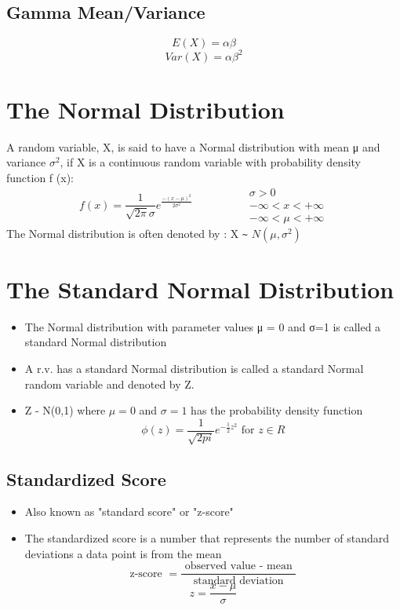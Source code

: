\documentclass{article}
\begin{document}
\subsection{Gamma Mean/Variance}
$$ E(X) = \alpha \beta$$
$$ Var(X) = \alpha \beta^2$$

\section{The Normal Distribution}
A random variable, X, is said to have a Normal distribution with
mean μ and variance \(\sigma^2\), if X is a continuous random variable with probability density function f (x):
$$ f(x) = \frac{1}{\sqrt{2\pi} \sigma} e^{\frac{-(x-\mu)^2}{2\sigma^2}} \hspace{2cm} \begin{matrix}
\sigma > 0 \\ - \infty < x < +\infty \\ -\infty < \mu < +\infty
\end{matrix}$$
The Normal distribution is often denoted by : X \verb|~| \(N (\mu, \sigma^2) \)

\section{The Standard Normal Distribution}
\begin{itemize}
\item The Normal distribution with parameter values μ = 0 and σ=1 is called a standard Normal distribution
\item A r.v. has a standard Normal distribution is called a standard Normal random variable and denoted by Z.
\item Z - N(0,1) where \(\mu = 0\) and \(\sigma = 1\) has the probability density function 
$$ \phi(z) = \frac{1}{\sqrt{2pi}} e^{-\frac{1}{2}z^2} \text{ for } z \in R $$
\end{itemize}


\subsection{Standardized Score}
\begin{itemize}
\item Also known as "standard score" or "z-score"
\item The standardized score is a number that represents the number of standard deviations a data point is from the mean
$$ \text{z-score } = \frac{\text{ observed value - mean }}{\text{standard deviation}}$$
$$z = \frac{x- \mu}{\sigma}$$
\end{itemize}
\end{document}
